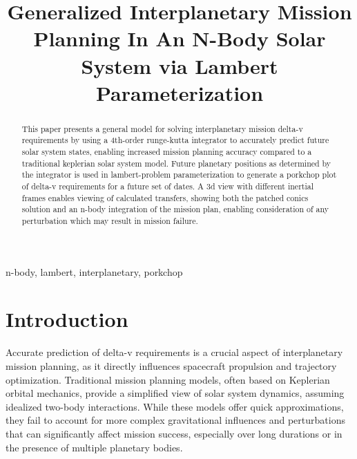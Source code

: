 \documentclass[conference]{IEEEtran}
\begin{document}
	
	\title{Generalized Interplanetary Mission Planning In An N-Body Solar System via Lambert Parameterization\\
	}
	
	\author{
	}
	
	\maketitle
	
	\begin{abstract}
		This paper presents a general model for solving interplanetary mission delta-v requirements by using a 4th-order runge-kutta integrator to accurately predict future solar system states, enabling increased mission planning accuracy compared to a traditional keplerian solar system model. Future planetary positions as determined by the integrator is used in lambert-problem parameterization to generate a porkchop plot of delta-v requirements for a future set of dates. A 3d view with different inertial frames enables viewing of calculated transfers, showing both the patched conics solution and an n-body integration of the mission plan, enabling consideration of any perturbation which may result in mission failure.
	\end{abstract}
	
	\begin{IEEEkeywords}
		n-body, lambert, interplanetary, porkchop
	\end{IEEEkeywords}
	
	\section{Introduction}
	Accurate prediction of delta-v requirements is a crucial aspect of interplanetary mission planning, as it directly influences spacecraft propulsion and trajectory optimization. Traditional mission planning models, often based on Keplerian orbital mechanics, provide a simplified view of solar system dynamics, assuming idealized two-body interactions. While these models offer quick approximations, they fail to account for more complex gravitational influences and perturbations that can significantly affect mission success, especially over long durations or in the presence of multiple planetary bodies.
	
\end{document}
